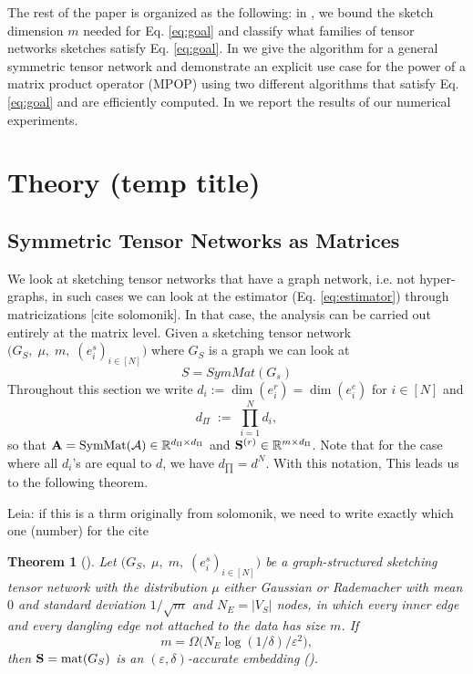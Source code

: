 \documentclass[11pt]{article}
\theoremstyle{plain}
\newtheorem{theorem}{Theorem}[section]
\theoremstyle{definition}
\theoremstyle{remark}
\begin{document}
The rest of the paper is organized as the following: in , we bound the sketch dimension $m$ needed for Eq. \eqref{eq:goal} and classify what families of tensor networks sketches satisfy  Eq. \ref{eq:goal}. In  we give the algorithm for a general symmetric tensor network and demonstrate an explicit use case for the power of a matrix product operator (MPOP) using two different algorithms that satisfy Eq. \eqref{eq:goal} and are efficiently computed.  In  we report the results of our numerical experiments. 

\section{Theory (temp title)}
\label{sec:theory}

\subsection{Symmetric Tensor Networks as Matrices}
\label{sec:matrixview}
We look at sketching tensor networks that have a graph network, i.e. not hyper-graphs, in such cases we can look at the estimator (Eq. \eqref{eq:estimator}) through matricizations {\color{red} [cite solomonik]}.
In that case, the analysis can be carried out entirely at the matrix level.
Given a sketching tensor network $  \bigl(G_S,\;\mu,\;m,\;(e_i^{s})_{i\in[N]}\bigr)$ where $G_S$  is a graph we can look at $$S=SymMat(G_s)$$
Throughout this section we write $d_i:=\dim(e_i^{r})=\dim(e_i^{c})$ for
$i\in[N]$ and
\[
  d_{\Pi}\;:=\;\prod_{i=1}^{N} d_i ,
\]
so that $\mathbf{A}=\operatorname{SymMat}(\mathcal{A})\in\mathbb{R}^{d_{\Pi}\times d_{\Pi}}$ and $\mathbf{S}^{(r)}\in\mathbb{R}^{m\times d_{\Pi}}$. 
Note that for the case where all $d_i$'s are equal to $d$, we have $d_{\prod} =d^N$.
With this notation, This leads us to the following theorem.

{\color{blue} Leia: if this is a thrm originally from solomonik, we need to write exactly which one (number) for the cite}
\begin{theorem}[{\cite[]{masolomonik2022}}]\label{prop:ma}
\leanaxiom
Let  $  \bigl(G_S,\;\mu,\;m,\;(e_i^{s})_{i\in[N]}\bigr)$ be a graph-structured sketching tensor network with the distribution $\mu$  either Gaussian or Rademacher with mean $0$ and standard deviation $1/\sqrt{m}$ and $N_E=|V_S|$ nodes, in which every inner edge and every dangling edge not attached to the data has size $m$. If
\[
  m=\Omega\!\bigl(N_E\log(1/\delta)/\varepsilon^{2}\bigr),
\]
then $\mathbf{S}=\mathrm{mat}(G_S)$ is an $(\varepsilon,\delta)$-accurate embedding ().
\end{theorem}
\end{document}
